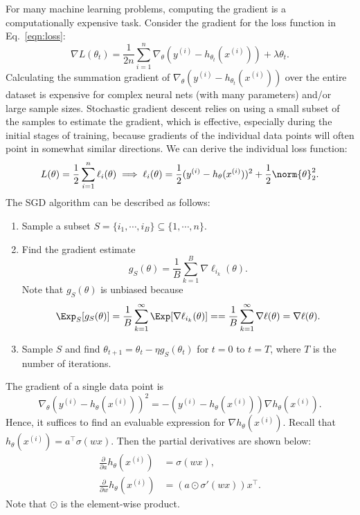 For many machine learning problems, computing the gradient is a computationally expensive task. Consider the gradient for the loss function in Eq.~\eqref{eqn:loss}:
\[
\nabla L(\theta_t) = \frac{1}{2n} \sum_{i=1}^n \nabla_\theta (y^{(i)} - h_{\theta_t}(x^{(i)})) + \lambda \theta_t.
\]
Calculating the summation gradient of $\nabla_\theta (y^{(i)} - h_{\theta_t}(x^{(i)}))$ over the entire dataset is expensive for complex neural nets (with many parameters) and/or large sample sizes. Stochastic gradient descent relies on using a small subset of the samples to estimate the gradient, which is effective, especially during the initial stages of training, because gradients of the individual data points will often point in somewhat similar directions. We can derive the individual loss function:
\[
L(\theta) = \frac{1}{2} \sum_{i=1}^n \ell_i(\theta) \implies \ell_i(\theta) = \frac{1}{2} (y^{(i)} - h_\theta(x^{(i)}))^2 + \frac{1}{2} \norm{\theta}_2^2.
\]
The SGD algorithm can be described as follows:
\begin{enumerate}
\item Sample a subset $S = \{i_1, \cdots, i_B\} \subseteq \{1, \cdots, n\}$.

\item Find the gradient estimate
\[
g_S(\theta) = \frac{1}{B} \sum_{k=1}^B \nabla \ell_{i_k}(\theta).
\]
Note that $g_S(\theta)$ is unbiased because
\[
\Exp_S[g_S(\theta)] = \frac{1}{B} \sum_{k=1}^\infty \Exp[\nabla \ell_{i_k}(\theta)] = = \frac{1}{B} \sum_{k=1}^\infty \nabla \ell(\theta) = \nabla \ell(\theta).
\]

\item Sample $S$ and find $\theta_{t+1} = \theta_t - \eta g_S(\theta_t)$ for $t = 0$ to $t = T$, where $T$ is the number of iterations.
\end{enumerate}

The gradient of a single data point is
\[
\nabla_\theta(y^{(i)} - h_\theta(x^{(i)}))^2 = -(y^{(i)} - h_\theta(x^{(i)})) \nabla h_\theta(x^{(i)}).
\]
Hence, it suffices to find an evaluable expression for $\nabla h_\theta(x^{(i)})$. Recall that $h_\theta(x^{(i)}) = a^\top \sigma(wx)$. Then the partial derivatives are shown below:
\[
\begin{split}
\frac{\partial}{\partial a} h_\theta(x^{(i)}) &= \sigma(wx) ,\\
\frac{\partial}{\partial w} h_\theta(x^{(i)}) &= (a \odot \sigma'(wx)) x^\top.
\end{split}
\]
Note that $\odot$ is the element-wise product.

